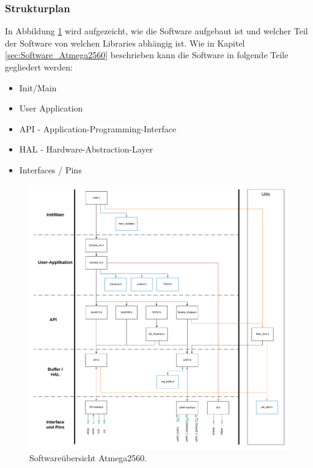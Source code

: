 \clearpage
\subsubsection{Strukturplan}
\label{subsubsec:Strukturplan_Atmega}

In Abbildung \ref{fig:Softwareuebersicht_Atmega2560} wird aufgezeicht, wie die Software aufgebaut ist und welcher Teil der Software von welchen Libraries abhängig ist. Wie in Kapitel \ref{sec:Software_Atmega2560} beschrieben kann die Software in folgende Teile gegliedert werden:
\begin{itemize}
\item Init/Main
\item User Application
\item API - Application-Programming-Interface
\item HAL - Hardware-Abstraction-Layer
\item Interfaces / Pins
\end{itemize}

\begin{figure}[h!]
	\centering
	\includegraphics[width=\textwidth]{graphics/Softwareuebersicht.pdf}
	\caption{Softwareübersicht Atmega2560.}
	\label{fig:Softwareuebersicht_Atmega2560}
\end{figure}

